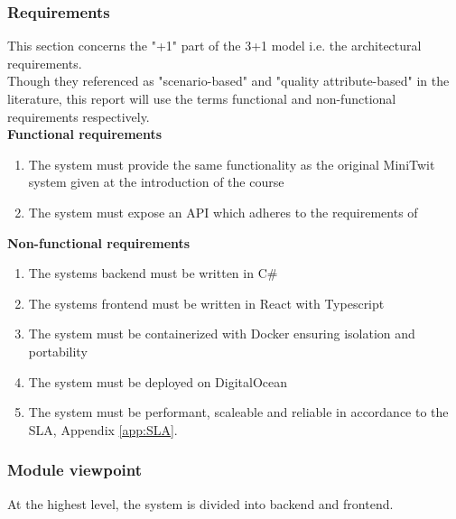 \subsubsection{Requirements}    
This section concerns the "+1" part of the 3+1 model i.e. the architectural requirements. \\
Though they referenced as "scenario-based" and "quality attribute-based" in the literature, this 
report will use the terms functional and non-functional requirements respectively. \\

\noindent
\textbf{Functional requirements}
\begin{enumerate}
    \item The system must provide the same functionality as the original MiniTwit system given at the introduction of the course
    \item The system must expose an API which adheres to the requirements of \cite{apispec} 
\end{enumerate} 

\noindent
\textbf{Non-functional requirements}
\begin{enumerate}
    \item The systems backend must be written in C\# 
    \item The systems frontend must be written in React with Typescript
    \item The system must be containerized with Docker ensuring isolation and portability
    \item The system must be deployed on DigitalOcean
    \item The system must be performant, scaleable and reliable in accordance to the SLA, Appendix \ref{app:SLA}.
\end{enumerate}
    
\subsubsection{Module viewpoint}
At the highest level, the system is divided into backend and frontend.\\

